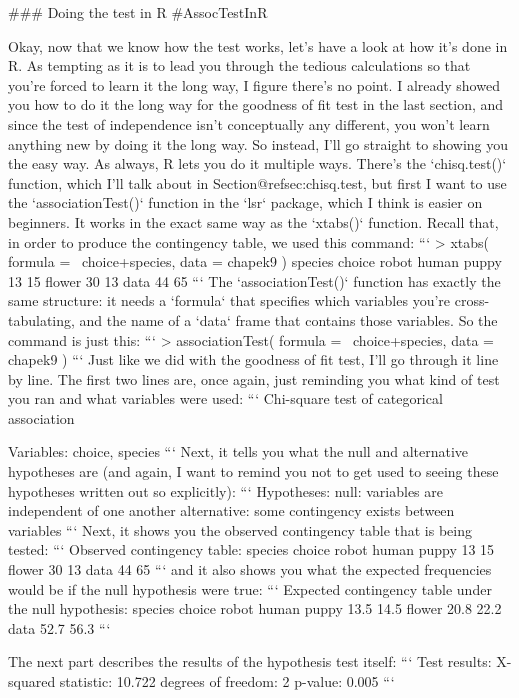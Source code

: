 ### Doing the test in R {#AssocTestInR}


Okay, now that we know how the test works, let's have a look at how it's done in R. As tempting as it is to lead you through the tedious calculations so that you're forced to learn it the long way, I figure there's no point. I already showed you how to do it the long way for the goodness of fit test in the last section, and since the test of independence isn't conceptually any different, you won't learn anything new by doing it the long way. So instead, I'll go straight to showing you the easy way. As always, R lets you do it multiple ways. There's the `chisq.test()` function, which I'll talk about in Section@refsec:chisq.test, but first I want to use the `associationTest()` function in the `lsr` package, which I think is easier on beginners. It works in the exact same way as the `xtabs()` function. Recall that, in order to produce the contingency table, we used this command:
```
> xtabs( formula = ~choice+species, data = chapek9 )
        species
choice   robot human
  puppy     13    15
  flower    30    13
  data      44    65
```
The `associationTest()` function has exactly the same structure: it needs a `formula` that specifies which variables you're cross-tabulating, and the name of a `data` frame that contains those variables. So the command is just this:
```
> associationTest( formula = ~choice+species, data = chapek9 )
```
Just like we did with the goodness of fit test, I'll go through it line by line. The first two lines are, once again, just reminding you what kind of test you ran and what variables were used:
```
     Chi-square test of categorical association

Variables:   choice, species 
```
Next, it tells you what the null and alternative hypotheses are (and again, I want to remind you not to get used to seeing these hypotheses written out so explicitly):
```
Hypotheses: 
   null:        variables are independent of one another
   alternative: some contingency exists between variables
```
Next, it shows you the observed contingency table that is being tested:
```
Observed contingency table:
        species
choice   robot human
  puppy     13    15
  flower    30    13
  data      44    65
```
and it also shows you what the expected frequencies would be if the null hypothesis were true:
```
Expected contingency table under the null hypothesis:
        species
choice   robot human
  puppy   13.5  14.5
  flower  20.8  22.2
  data    52.7  56.3
```  

The next part describes the results of the hypothesis test itself:
```
Test results: 
   X-squared statistic:  10.722 
   degrees of freedom:  2 
   p-value:  0.005 
```

